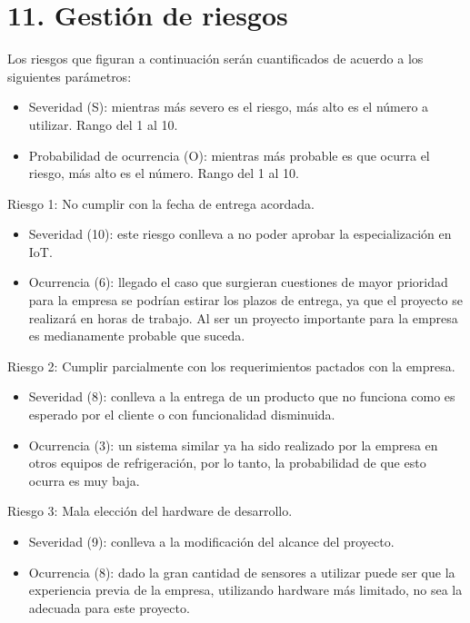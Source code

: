 \documentclass[
11pt, %
]{charter}
\begin{document}
\section{11. Gestión de riesgos}
\label{sec:riesgos}

Los riesgos que figuran a continuación serán cuantificados de acuerdo a los siguientes parámetros:
\begin{itemize}
	\item Severidad (S): mientras más severo es el riesgo, más alto es el número a utilizar. Rango del 1 al 10.\\
	\item Probabilidad de ocurrencia (O): mientras más probable es que ocurra el riesgo, más alto es el número. Rango del 1 al 10.\\
\end{itemize}   

Riesgo 1: No cumplir con la fecha de entrega acordada.
\begin{itemize}
	\item Severidad (10): este riesgo conlleva a no poder aprobar la especialización en IoT.\\
	\item Ocurrencia (6): llegado el caso que surgieran cuestiones de mayor prioridad para la empresa se podrían estirar los plazos de entrega, ya que el proyecto se realizará en horas de trabajo. Al ser un proyecto importante para la empresa es medianamente probable que suceda. \\
\end{itemize}   

\pagebreak

Riesgo 2: Cumplir parcialmente con los requerimientos pactados con la empresa.
\begin{itemize}
	\item Severidad (8): conlleva a la entrega de un producto que no funciona como es esperado por el cliente o con funcionalidad disminuida.
	\item Ocurrencia (3): un sistema similar ya ha sido realizado por la empresa en otros equipos de refrigeración, por lo tanto, la probabilidad de que esto ocurra es muy baja.
\end{itemize}

Riesgo 3: Mala elección del hardware de desarrollo.
\begin{itemize}
	\item Severidad (9): conlleva a la modificación del alcance del proyecto. 
	\item Ocurrencia (8): dado la gran cantidad de sensores a utilizar puede ser que la experiencia previa de la empresa, utilizando hardware más limitado, no sea la adecuada para este proyecto.
\end{itemize}
\end{document}
